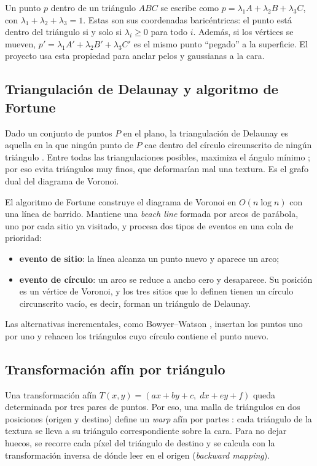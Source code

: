 Un punto $p$ dentro de un triángulo $ABC$ se escribe como $p=\lambda_1A+\lambda_2B+\lambda_3C$, con $\lambda_1+\lambda_2+\lambda_3=1$. Estas son sus coordenadas baricéntricas: el punto está dentro del triángulo si y solo si $\lambda_i\ge0$ para todo $i$. Además, si los vértices se mueven, $p'=\lambda_1A'+\lambda_2B'+\lambda_3C'$ es el mismo punto ``pegado'' a la superficie. El proyecto usa esta propiedad para anclar pelos y gaussianas a la cara.

\subsection{Triangulación de Delaunay y algoritmo de Fortune}

Dado un conjunto de puntos $P$ en el plano, la triangulación de Delaunay es aquella en la que ningún punto de $P$ cae dentro del círculo circunscrito de ningún triángulo \cite{delaunay1934}. Entre todas las triangulaciones posibles, maximiza el ángulo mínimo \cite{deberg2008}; por eso evita triángulos muy finos, que deformarían mal una textura. Es el grafo dual del diagrama de Voronoi.

El algoritmo de Fortune \cite{fortune1987} construye el diagrama de Voronoi en $O(n\log n)$ con una línea de barrido. Mantiene una \emph{beach line} formada por arcos de parábola, uno por cada sitio ya visitado, y procesa dos tipos de eventos en una cola de prioridad:
\begin{itemize}
  \item \textbf{evento de sitio}: la línea alcanza un punto nuevo y aparece un arco;
  \item \textbf{evento de círculo}: un arco se reduce a ancho cero y desaparece. Su posición es un vértice de Voronoi, y los tres sitios que lo definen tienen un círculo circunscrito vacío, es decir, forman un triángulo de Delaunay.
\end{itemize}
Las alternativas incrementales, como Bowyer--Watson \cite{bowyer1981,watson1981}, insertan los puntos uno por uno y rehacen los triángulos cuyo círculo contiene el punto nuevo.

\subsection{Transformación afín por triángulo}

Una transformación afín $T(x,y)=(a x+b y+c,\; d x+e y+f)$ queda determinada por tres pares de puntos. Por eso, una malla de triángulos en dos posiciones (origen y destino) define un \emph{warp} afín por partes \cite{szeliski2022}: cada triángulo de la textura se lleva a su triángulo correspondiente sobre la cara. Para no dejar huecos, se recorre cada píxel del triángulo de destino y se calcula con la transformación inversa de dónde leer en el origen (\emph{backward mapping}).

